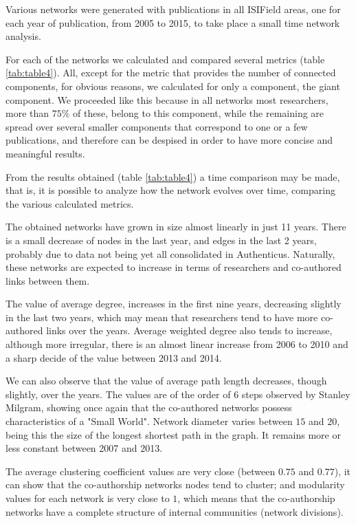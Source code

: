 \documentclass{article}
\begin{document}
\begin{multicols}{2}
Various networks were generated with publications in all ISIField areas, one for each year of publication, from 2005 to 2015, to take place a small time network analysis.

For each of the networks we calculated and compared several metrics (table \ref{tab:table4}). All, except for the metric that provides the number of connected components, for obvious reasons, we calculated for only a component, the giant component. We proceeded like this because in all networks most researchers, more than $75\%$ of these, belong to this component, while the remaining are spread over several smaller components that correspond to one or a few publications, and therefore can be despised in order to have more concise and meaningful results.

From the results obtained (table \ref{tab:table4}) a time comparison may be made, that is, it is possible to analyze how the network evolves over time, comparing the various calculated metrics.

The obtained networks have grown in size almost linearly in just 11 years. There is a small decrease of nodes in the last year, and edges in the last 2 years, probably due to data not being yet all consolidated in Authenticus. Naturally, these networks are expected to increase in terms of researchers and co-authored links between them.

The value of average degree, increases in the first nine years, decreasing slightly in the last two years, which may mean that researchers tend to have more co-authored links over the years. Average weighted degree also tends to increase, although more irregular, there is an almost linear increase from 2006 to 2010 and a sharp decide of the value between 2013 and 2014.

We can also observe that the value of average path length decreases, though slightly, over the years. The values are of the order of $6$ steps observed by Stanley Milgram, showing once again that the co-authored networks possess characteristics of a "Small World". Network diameter varies between $15$ and $20$, being this the size of the longest shortest path in the graph. It remains more or less constant between 2007 and 2013.

The average clustering coefficient values are very close (between $0.75$ and $0.77$), it can show that the co-authorship networks nodes tend to cluster; and modularity values for each network is very close to $1$, which means that the co-authorship networks have a complete structure of internal communities (network divisions).


\end{multicols}
\end{document}
